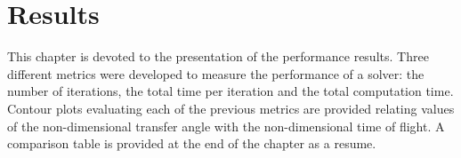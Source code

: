 \chapter{Results}

This chapter is devoted to the presentation of the performance results. Three
different metrics were developed to measure the performance of a solver: the
number of iterations, the total time per iteration and the total computation
time. Contour plots evaluating each of the previous metrics are provided
relating values of the non-dimensional transfer angle with the non-dimensional
time of flight. A comparison table is provided at the end of the chapter as a
resume.




